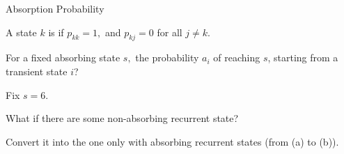 \begin{frame}{Absorption Probability}

{
\small
\plitemsep 0.03in
\bci
\item<1->  A state $k$ is  if
$p_{kk}=1,$ and $p_{kj}=0$ for all $j\neq k.$


\item<3->[\redf{(Q)}] For a fixed absorbing state $s,$ the probability $a_i$ of reaching $s$, starting from a transient state $i$?


\item<4-> Fix $s=6.$ 
\vspace{-0.3cm}
\eci
}
{
\vspace{-0.4cm}
\vspace{-0.6cm}
}

\small
\bci
\item<5->  What if there are some non-absorbing recurrent state?

\item<6-> Convert it into the one only with absorbing recurrent states (from (a) to (b)).
\eci



\end{frame}

